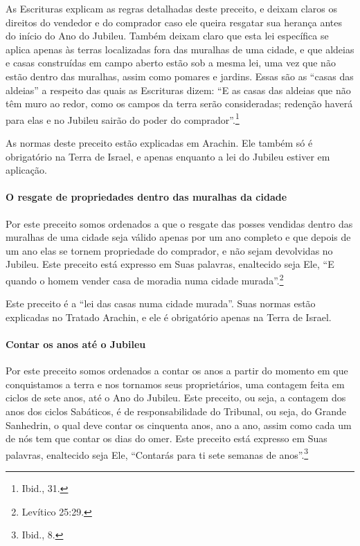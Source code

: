 \begin{multicols}{2}
As Escrituras explicam as regras detalhadas deste preceito, e deixam
claros os direitos do vendedor e do comprador caso ele queira resgatar
sua herança antes do início do Ano do Jubileu. Também deixam claro que
esta lei específica se aplica apenas às terras localizadas fora das
muralhas de uma cidade, e que aldeias e casas construídas em campo
aberto estão sob a mesma lei, uma vez que não estão dentro das muralhas,
assim como pomares e jardins. Essas são as ``casas das aldeias'' a
respeito das quais as Escrituras dizem: ``E as casas das aldeias que não
têm muro ao redor, como os campos da terra serão consideradas; redenção
haverá para elas e no Jubileu sairão do poder do comprador''.\footnote{Ibid., 31.}

As normas deste preceito estão explicadas em Arachin\starr. Ele também só é
obrigatório na Terra de Israel, e apenas enquanto a lei do Jubileu
estiver em aplicação.

\paragraph{O resgate de propriedades dentro das muralhas da cidade}

Por este preceito somos ordenados a que o resgate das posses vendidas
dentro das muralhas de uma cidade seja válido apenas por um ano
completo e que depois de um ano elas se tornem propriedade do
comprador, e não sejam devolvidas no Jubileu. Este preceito está
expresso em Suas palavras, enaltecido seja Ele, ``E quando o homem
vender casa de moradia numa cidade murada''.\footnote{Levítico 25:29.}

Este preceito é a ``lei das casas numa cidade murada''. Suas normas
estão explicadas no Tratado Arachin\starr, e ele é obrigatório apenas na Terra
de Israel.

\paragraph{Contar os anos até o Jubileu}

Por este preceito somos ordenados a contar os anos a partir do momento
em que conquistamos a terra e nos tornamos seus proprietários, uma
contagem feita em ciclos de sete anos, até o Ano do Jubileu. Este
preceito, ou seja, a contagem dos anos dos ciclos Sabáticos, é de
responsabilidade do Tribunal, ou seja, do Grande Sanhedrin\starr, o qual deve
contar os cinquenta anos, ano a ano, assim como cada um de nós tem que
contar os dias do omer\starr. Este preceito está expresso em Suas
palavras, enaltecido seja Ele, ``Contarás para ti sete semanas de anos''.\footnote{Ibid., 8.}


\end{multicols}

